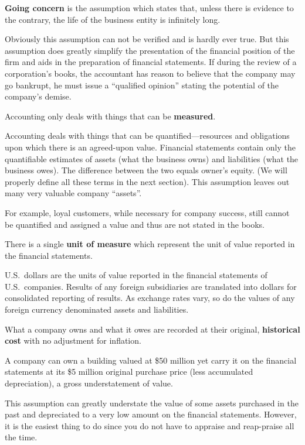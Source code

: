\textbf{Going concern} is the assumption which states that, unless there is evidence to the contrary, the life of the
business entity is infinitely long.
\ed

Obviously this assumption can not be verified and is hardly ever true. But this assumption does greatly simplify the
presentation of the financial position of the firm and aids in the preparation of financial statements. If during the
review of a corporation's books, the accountant has reason to believe that the company may go bankrupt, he must issue
a ``qualified opinion'' stating the potential of the company's demise.

\bd[Measurement]
Accounting only deals with things that can be \textbf{measured}.
\ed

Accounting deals with things that can be quantified—resources and obligations upon which there is an agreed-upon
value. Financial statements contain only the quantifiable estimates of assets (what the business owns) and
liabilities (what the business owes). The difference between the two equals owner's equity. (We will properly define
all these terms in the next section). This assumption leaves out many very valuable company ``assets''.

\be
For example, loyal customers, while necessary for company success, still cannot be quantified and assigned a value
and thus are not stated in the books.
\ee

There is a single \textbf{unit of measure} which represent the unit of value reported in the financial statements.
\ed

\be
U.S.\ dollars are the units of value reported in the financial statements of U.S.\ companies. Results of any foreign
subsidiaries are translated into dollars for consolidated reporting of results. As exchange rates vary, so do the values
of any foreign currency denominated assets and liabilities.
\ee

What a company owns and what it owes are recorded at their original, \textbf{historical cost } with no adjustment for
inflation.
\ed

\be
A company can own a building valued at \$50 million yet carry it on the financial statements at its \$5 million
original purchase price (less accumulated depreciation), a gross understatement of value.
\ee

This assumption can greatly understate the value of some assets purchased in the past and depreciated to a very low
amount on the financial statements. However, it is the easiest thing to do since you do not have to appraise and
reap-praise all the time.

